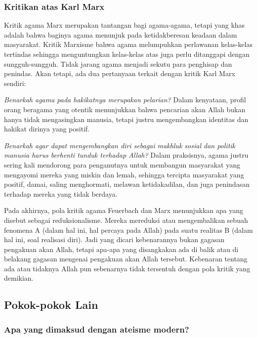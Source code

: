 \documentclass[11pt,twoside,a5paper,openany]{memoir}
\begin{document}
\hypertarget{kritikan-atas-karl-marx}{%
\subsubsection{Kritikan atas Karl Marx}\label{kritikan-atas-karl-marx}}

Kritik agama Marx merupakan tantangan bagi agama-agama, tetapi yang khas
adalah bahwa baginya agama menunjuk pada ketidakberesan keadaan dalam
masyarakat. Kritik Marxisme bahwa agama melumpuhkan perlawanan
kelas-kelas tertindas sehingga menguntungkan kelas-kelas atas juga perlu
ditanggapi dengan sungguh-sungguh. Tidak jarang agama menjadi sekutu
para penghisap dan penindas. Akan tetapi, ada dua pertanyaan terkait
dengan kritik Karl Marx sendiri:

\emph{Benarkah agama pada hakikatnya merupakan pelarian?} Dalam
kenyataan, profil orang beragama yang otentik menunjukkan bahwa
pencarian akan Allah bukan hanya tidak mengasingkan manusia, tetapi
justru mengembangkan identitas dan hakikat dirinya yang positif.

\emph{Benarkah agar dapat mengembangkan diri sebagai makhluk sosial dan
politik manusia harus berhenti tunduk terhadap Allah?} Dalam praksisnya,
agama justru sering kali mendorong para penganutnya untuk membangun
masyarakat yang mengayomi mereka yang miskin dan lemah, sehingga
tercipta masyarakat yang positif, damai, saling menghormati, melawan
ketidakadilan, dan juga penindasan terhadap mereka yang tidak berdaya.

Pada akhirnya, pola kritik agama Feuerbach dan Marx menunjukkan apa yang
disebut sebagai reduksionalisme. Mereka mereduksi atau mengembalikan
sebuah fenomena A (dalam hal ini, hal percaya pada Allah) pada suatu
realitas B (dalam hal ini, soal realisasi diri). Jadi yang dicari
kebenarannya bukan gagasan pengakuan akan Allah, tetapi apa-apa yang
disangkakan ada di balik atau di belakang gagasan mengenai pengakuan
akan Allah tersebut. Kebenaran tentang ada atau tidaknya Allah pun
sebenarnya tidak tersentuh dengan pola kritik yang demikian.

\hypertarget{pokok-pokok-lain-5}{%
\subsection{Pokok-pokok Lain}\label{pokok-pokok-lain-5}}

\hypertarget{apa-yang-dimaksud-dengan-ateisme-modern}{%
\subsubsection{Apa yang dimaksud dengan ateisme
modern?}\label{apa-yang-dimaksud-dengan-ateisme-modern}}
\end{document}
